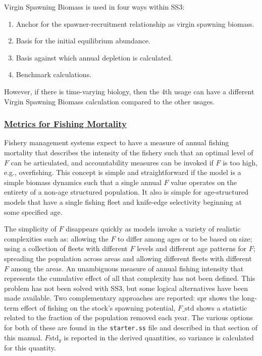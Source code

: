 Virgin Spawning Biomass is used in four ways within SS3:
\begin{enumerate}
	\item Anchor for the spawner-recruitment relationship as virgin spawning biomass.
	\item Basis for the initial equilibrium abundance. 
	\item Basis against which annual depletion is calculated.
	\item Benchmark calculations.
\end{enumerate}
However, if there is time-varying biology, then the 4th usage can have a different Virgin Spawning Biomass calculation compared to the other usages.

\hypertarget{FMortality}{}
\subsubsection[Metrics for Fishing Mortality]{\protect\hyperlink{FMortality}{Metrics for Fishing Mortality}}
Fishery management systems expect to have a measure of annual fishing mortality that describes the intensity of the fishery such that an optimal level of $F$ can be articulated, and accountability measures can be invoked if $F$ is too high, e.g., overfishing. This concept is simple and straightforward if the model is a simple biomass dynamics such that a single annual $F$ value operates on the entirety of a non-age structured population. It also is simple for age-structured models that have a single fishing fleet and knife-edge selectivity beginning at some specified age.

The simplicity of $F$ disappears quickly as models invoke a variety of realistic complexities such as: allowing the $F$ to differ among ages or to be based on size; using a collection of fleets with different $F$ levels and different age patterns for $F$; spreading the population across areas and allowing different fleets with different $F$ among the areas. An unambiguous measure of annual fishing intensity that represents the cumulative effect of all that complexity has not been defined. This problem has not been solved with SS3, but some logical alternatives have been made available. Two complementary approaches are reported: \gls{spr} shows the long-term effect of fishing on the stock’s spawning potential, $F\text{\_std}$ shows a statistic related to the fraction of the population removed each year. The various options for both of these are found in the \texttt{starter.ss} file and described in that section of this manual. $F\text{std}_y$ is reported in the derived quantities, so variance is calculated for this quantity.


